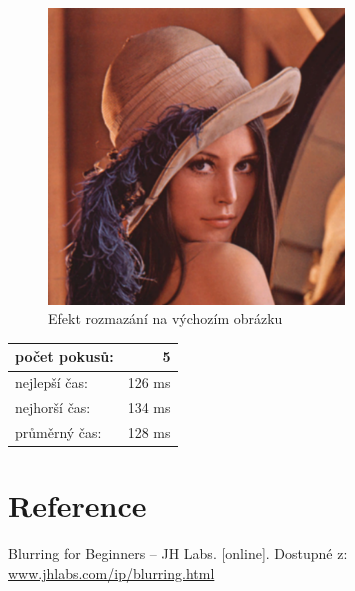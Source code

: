 \documentclass[12pt]{scrartcl}
\begin{document}
\begin{figure}[!ht]
	\centering
	\label{obr:blur}
	\includegraphics[width=0.7\textwidth,natwidth=1,natheight=1]{blur.pdf}
	\caption{Efekt rozmazání na výchozím obrázku}
\end{figure}	

\begin{center}
  \begin{tabular}{ | l | r | }
    \hline
    počet pokusů: & 5 \\ \hline
    nejlepší čas: & 126 ms \\ \hline
    nejhorší čas: & 134 ms \\ \hline
    průměrný čas: & 128 ms \\
    \hline
  \end{tabular}
\end{center}

\section{Reference}

Blurring for Beginners – JH Labs. [online]. Dostupné z: \href{http://www.jhlabs.com/ip/blurring.html}{www.jhlabs.com/ip/blurring.html}
\end{document}
